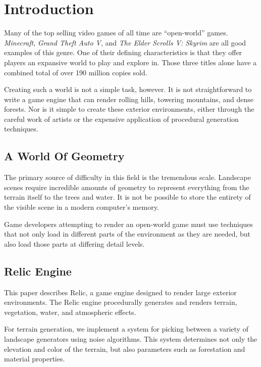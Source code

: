 
\chapter{Introduction}

Many of the top selling video games of all time are ``open-world'' games.
{\em Minecraft}, {\em Grand Theft Auto V}, and {\em The Elder Scrolls V: Skyrim} are all good examples of this genre.
One of their defining characteristics is that they offer players an expansive world to play and explore in.
Those three titles alone have a combined total of over 190 million copies sold.

Creating such a world is not a simple task, however.
It is not straightforward to write a game engine that can render rolling hills, towering mountains, and dense forests.
Nor is it simple to create these exterior environments, either through the careful work of artists or the expensive application of procedural generation techniques.


\section{A World Of Geometry}

The primary source of difficulty in this field is the tremendous scale.
Landscape scenes require incredible amounts of geometry to represent everything from the terrain itself to the trees and water.
It is not be possible to store the entirety of the visible scene in a modern computer's memory.

Game developers attempting to render an open-world game must use techniques that not only load in different parts of the environment as they are needed, but also load those parts at differing detail levels.


\section{Relic Engine}

This paper describes Relic, a game engine designed to render large exterior environments.
The Relic engine procedurally generates and renders terrain, vegetation, water, and atmospheric effects.

For terrain generation, we implement a system for picking between a variety of landscape generators using noise algorithms.
This system determines not only the elevation and color of the terrain, but also parameters such as forestation and material properties.

